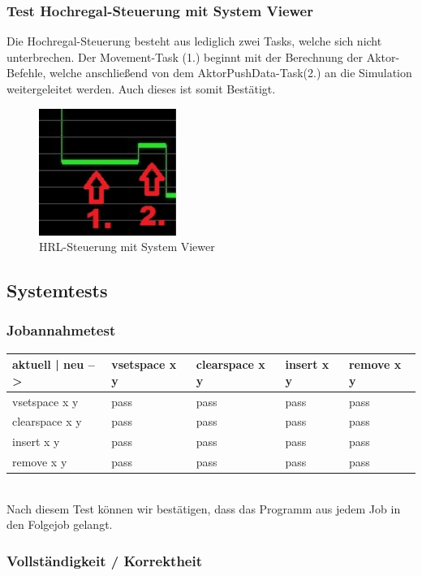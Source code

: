 \subsubsection{Test Hochregal-Steuerung mit System Viewer}
Die Hochregal-Steuerung besteht aus lediglich zwei Tasks, welche sich nicht unterbrechen. Der Movement-Task (1.) beginnt mit der Berechnung der Aktor-Befehle, welche anschließend von dem AktorPushData-Task(2.) an die Simulation weitergeleitet werden. Auch dieses ist somit Bestätigt.
\begin{figure}[H]
	\centering
  \includegraphics[width=0.4\textwidth]{diagrams/steuerung_zeit.jpg}
	\caption{HRL-Steuerung mit System Viewer}
	\label{fig5}
\end{figure}
\subsection {Systemtests}

\subsubsection {Jobannahmetest}
\begin{tabular}{|l|l|l|l|l|}
\hline
 aktuell | neu -->&  vsetspace x y & clearspace x y  & insert x y & remove x y\\
\hline
vsetspace	x y & pass & pass & pass  & pass\\
\hline
clearspace	x y & pass & pass & pass  & pass \\
\hline
insert 		x y & pass & pass & pass & pass\\
\hline
remove	x y & pass & pass & pass & pass\\
\hline
\end{tabular}
\ \\
Nach diesem Test können wir bestätigen, dass das Programm aus jedem Job in den Folgejob gelangt.

\subsubsection {Vollständigkeit / Korrektheit} 

